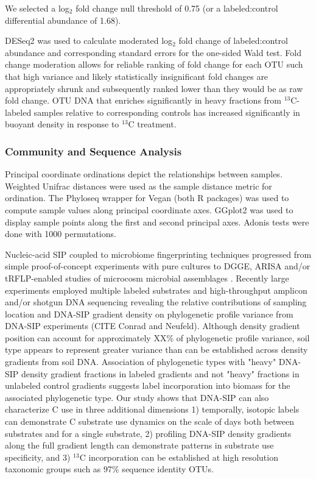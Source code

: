 \documentclass{article}
\begin{document}
We selected a log$_{2}$ fold change null threshold of
0.75 (or a labeled:control differential abundance of 1.68). 

DESeq2 was used to calculate moderated log$_{2}$ fold change of labeled:control
abundance and corresponding standard errors for the one-sided Wald test. Fold
change moderation allows for reliable ranking of fold change for each OTU such
that high variance and likely statistically insignificant fold changes are
appropriately shrunk and subsequently ranked lower than they would be as raw
fold change. OTU DNA that enriches significantly in heavy fractions from
$^{13}$C-labeled samples relative to corresponding controls has increased
significantly in buoyant density in response to $^{13}$C treatment.

\subsubsection{Community and Sequence Analysis}\label{ord} Principal coordinate
ordinations depict the relationships between samples. Weighted Unifrac
\citep{Lozupone_2005} distances were used as the sample distance metric for
ordination. The Phyloseq \citep{McMurdie_2013} wrapper for Vegan
\citep{Dixon_2003} (both R packages) was used to compute sample values along
principal coordinate axes. GGplot2 \citep{Wickham_2009} was used to display
sample points along the first and second principal axes. Adonis tests
\citep{Anderson_2001} were done with 1000 permutations.

Nucleic-acid SIP coupled to microbiome fingerprinting techniques progressed
from simple proof-of-concept experiments with pure cultures
\citep{radajewski2000stable} to DGGE, ARISA and/or tRFLP-enabled studies of
microcosm microbial assemblages \citep{Haichar_2007}. Recently large
experiments employed multiple labeled substrates and high-throughput amplicon
and/or shotgun DNA sequencing \citep{Verastegui_2014} revealing the relative
contributions of sampling location and DNA-SIP gradient density on phylogenetic
profile variance from DNA-SIP experiments (CITE Conrad and Neufeld). Although
density gradient position can account for approximately XX\% of phylogenetic
profile variance, soil type appears to represent greater variance than can be
established across density gradients from soil DNA. Association of phylogenetic
types with "heavy" DNA-SIP density gradient fractions in labeled gradients and
not "heavy" fractions in unlabeled control gradients suggests label
incorporation into biomass for the associated phylogenetic type. Our study
shows that DNA-SIP can also characterize C use in three additional 
dimensions 1) temporally, isotopic labels can demonstrate C substrate use
dynamics on the scale of days both between substrates and for a single
substrate, 2) profiling DNA-SIP density gradients along the full gradient
length can demonstrate patterns in substrate use specificity, and 3) $^{13}$C
incorporation can be established at high resolution taxonomic groups such
as 97\% sequence identity OTUs.
\end{document}

